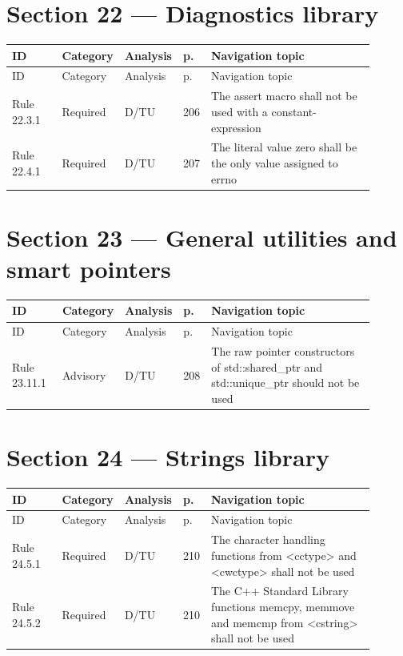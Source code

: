 \documentclass[10pt,letterpaper]{article}
\begin{document}
\section{Section 22 --- Diagnostics library}
\small\setlength{\tabcolsep}{3pt}\renewcommand{\arraystretch}{1.15}
\begin{longtable}{p{0.14\linewidth}p{0.14\linewidth}p{0.1\linewidth}p{0.045\linewidth}p{0.475\linewidth}}
\toprule
ID & Category & Analysis & p. & Navigation topic\\ \midrule
\endfirsthead
\toprule
ID & Category & Analysis & p. & Navigation topic\\ \midrule
\endhead
Rule 22.3.1 & Required & D/TU & 206 & The assert macro shall not be used with a constant-expression\\
Rule 22.4.1 & Required & D/TU & 207 & The literal value zero shall be the only value assigned to errno\\
\bottomrule
\end{longtable}
\normalsize

\section{Section 23 --- General utilities and smart pointers}
\small\setlength{\tabcolsep}{3pt}\renewcommand{\arraystretch}{1.15}
\begin{longtable}{p{0.14\linewidth}p{0.14\linewidth}p{0.1\linewidth}p{0.045\linewidth}p{0.475\linewidth}}
\toprule
ID & Category & Analysis & p. & Navigation topic\\ \midrule
\endfirsthead
\toprule
ID & Category & Analysis & p. & Navigation topic\\ \midrule
\endhead
Rule 23.11.1 & Advisory & D/TU & 208 & The raw pointer constructors of std::shared\_ptr and std::unique\_ptr should not be used\\
\bottomrule
\end{longtable}
\normalsize

\section{Section 24 --- Strings library}
\small\setlength{\tabcolsep}{3pt}\renewcommand{\arraystretch}{1.15}
\begin{longtable}{p{0.14\linewidth}p{0.14\linewidth}p{0.1\linewidth}p{0.045\linewidth}p{0.475\linewidth}}
\toprule
ID & Category & Analysis & p. & Navigation topic\\ \midrule
\endfirsthead
\toprule
ID & Category & Analysis & p. & Navigation topic\\ \midrule
\endhead
Rule 24.5.1 & Required & D/TU & 210 & The character handling functions from \textless{}cctype\textgreater{} and \textless{}cwctype\textgreater{} shall not be used\\
Rule 24.5.2 & Required & D/TU & 210 & The C++ Standard Library functions memcpy, memmove and memcmp from \textless{}cstring\textgreater{} shall not be used\\
\bottomrule
\end{longtable}
\normalsize
\end{document}
